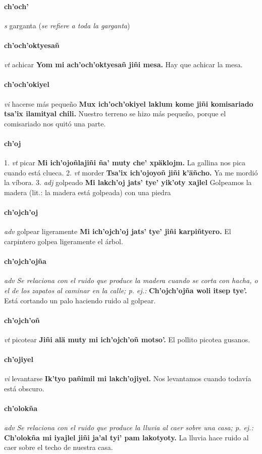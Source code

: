 \documentclass{scrbook}
\newcommand{\entry}[1]{\paragraph{#1}}
\newcommand{\onedefinition}[1]{#1.}
\newcommand{\nontranslationdef}[1]{\textit{#1}}
\newcommand{\partofspeech}[1]{\textit{#1}}
\newcommand{\spanishtranslation}[1]{#1}
\newcommand{\clarification}[1]{(\textit{#1})}
\newcommand{\cholexample}[1]{\textbf{#1}}
\newcommand{\exampletranslation}[1]{#1}
\begin{document}
\begin{multicols}{2}
\entry{ch'och'}
\partofspeech{s}
\spanishtranslation{garganta}
\clarification{se refiere a toda la garganta}

\entry{ch'och'oktyesañ}
\partofspeech{vt}
\spanishtranslation{achicar}
\cholexample{Yom mi ach'och'oktyesañ jiñi mesa.}
\exampletranslation{Hay que achicar la mesa.}

\entry{ch'och'okiyel}
\partofspeech{vi}
\spanishtranslation{hacerse más pequeño}
\cholexample{Mux ich'och'okiyel laklum kome jiñi komisariado tsa'ix ilamityal chili.}
\exampletranslation{Nuestro terreno se hizo más pequeño, porque el comisariado nos quitó una parte.}

\entry{ch'oj}
\onedefinition{1}
\partofspeech{vt}
\spanishtranslation{picar}
\cholexample{Mi ich'ojoñlajiñi ña' muty che' xpäklojm.}
\exampletranslation{La gallina nos pica cuando está clueca.}
\onedefinition{2}
\partofspeech{vt}
\spanishtranslation{morder}
\cholexample{Tsa'ix ich'ojoyoñ jiñi k'äñcho.}
\exampletranslation{Ya me mordió la víbora.}
\onedefinition{3}
\partofspeech{adj}
\spanishtranslation{golpeado}
\cholexample{Mi lakch'oj jats' tye' yik'oty xajlel}
\exampletranslation{Golpeamos la madera (lit.: la madera está golpeada) con una piedra}

\entry{ch'ojch'oj}
\partofspeech{adv}
\spanishtranslation{golpear ligeramente}
\cholexample{Mi ich'ojch'oj jats' tye' jiñi karpiñtyero.}
\exampletranslation{El carpintero golpea ligeramente el árbol.}

\entry{ch'ojch'ojña}
\partofspeech{adv}
\nontranslationdef{Se relaciona con el ruido que produce la madera cuando se corta con hacha, o el de los zapatos al caminar en la calle; p. ej.:}
\cholexample{Ch'ojch'ojña woli itsep tye'.}
\exampletranslation{Está cortando un palo haciendo ruido al golpear.}

\entry{ch'ojch'oñ}
\partofspeech{vt}
\spanishtranslation{picotear}
\cholexample{Jiñi alä muty mi ich'ojch'oñ motso'.}
\exampletranslation{El pollito picotea gusanos.}

\entry{ch'ojiyel}
\partofspeech{vi}
\spanishtranslation{levantarse}
\cholexample{Ik'tyo pañimil mi lakch'ojiyel.}
\exampletranslation{Nos levantamos cuando todavía está obscuro.}

\entry{ch'olokña}
\partofspeech{adv}
\nontranslationdef{Se relaciona con el ruido que produce la lluvia al caer sobre una casa; p. ej.:}
\cholexample{Ch'olokña mi iyajlel jiñi ja'al tyi' pam lakotyoty.}
\exampletranslation{La lluvia hace ruido al caer sobre el techo de nuestra casa.}


\end{multicols}
\end{document}
